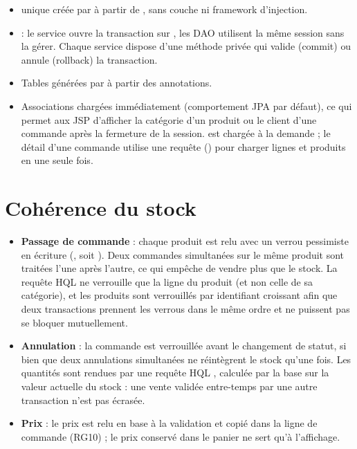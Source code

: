 \begin{itemize}
  \item {} unique créée par  à partir de , sans couche
         ni framework d'injection.
  \item {} : le service ouvre la transaction sur
        , les DAO utilisent la même session sans la gérer. Chaque service dispose d'une
        méthode privée  qui valide (commit) ou annule (rollback) la transaction.
  \item Tables générées par  à partir des annotations.
  \item Associations  chargées immédiatement (comportement JPA par défaut), ce qui permet aux JSP
        d'afficher la catégorie d'un produit ou le client d'une commande après la fermeture de la session.
         est chargée à la demande ; le détail d'une commande utilise une requête 
        () pour charger lignes et produits en une seule fois.
\end{itemize}

\section{Cohérence du stock}

\begin{itemize}
  \item \textbf{Passage de commande} : chaque produit est relu avec un verrou pessimiste en écriture
        (, soit ). Deux commandes simultanées sur le même produit
        sont traitées l'une après l'autre, ce qui empêche de vendre plus que le stock. La requête HQL ne verrouille
        que la ligne du produit (et non celle de sa catégorie), et les produits sont verrouillés par identifiant
        croissant afin que deux transactions prennent les verrous dans le même ordre et ne puissent pas se bloquer
        mutuellement.
  \item \textbf{Annulation} : la commande est verrouillée avant le changement de statut, si bien que deux annulations
        simultanées ne réintègrent le stock qu'une fois. Les quantités sont rendues par une requête HQL
        , calculée par la base sur la valeur actuelle du stock :
        une vente validée entre-temps par une autre transaction n'est pas écrasée.
  \item \textbf{Prix} : le prix est relu en base à la validation et copié dans la ligne de commande (RG10) ; le prix
        conservé dans le panier ne sert qu'à l'affichage.
\end{itemize}

